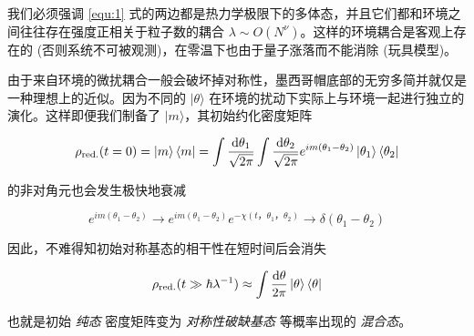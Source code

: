 我们必须强调 \eqref{equ:1} 式的两边都是热力学极限下的多体态，并且它们都和环境之间往往存在强度正相关于粒子数的耦合 $\lambda \sim O(N^\nu)$。这样的环境耦合是客观上存在的 (否则系统不可被观测)，在零温下也由于量子涨落而不能消除 (玩具模型)。

由于来自环境的微扰耦合一般会破坏掉对称性，墨西哥帽底部的无穷多简并就仅是一种理想上的近似。因为不同的 $|\theta\rangle$ 在环境的扰动下实际上与环境一起进行独立的演化。这样即便我们制备了 $|m\rangle$，其初始约化密度矩阵

\begin{equation}
    \rho_{\text{red.}}(t=0) = \ket{m} \bra{m} = \int \frac{\mathop{}\!\mathrm{d} \theta_1}{\sqrt{2\pi}} \int \frac{\mathop{}\!\mathrm{d} \theta_2}{\sqrt{2\pi}} e^{im(\theta_1-\theta_2)} \ket{\theta_1} \bra{\theta_2}
    \label{equ:2}
\end{equation}

的非对角元也会发生极快地衰减

\begin{equation}
    e^{im(\theta_1-\theta_2)} \to e^{im(\theta_1-\theta_2)} e^{-\chi(t，\theta_1，\theta_2)} \to \delta(\theta_1 -\theta_2)
    \label{equ:3}
\end{equation}

因此，不难得知初始对称基态的相干性在短时间后会消失

\begin{equation}
    \rho_{\mathrm{red.}}(t \gg \hbar \lambda^{-1}) \approx \int \frac{\mathop{}\!\mathrm{d} \theta}{2\pi} \ket{\theta} \bra{\theta}
    \label{equ:4}
\end{equation}

也就是初始 \emph{纯态} 密度矩阵变为 \emph{对称性破缺基态} 等概率出现的 \emph{混合态}。
